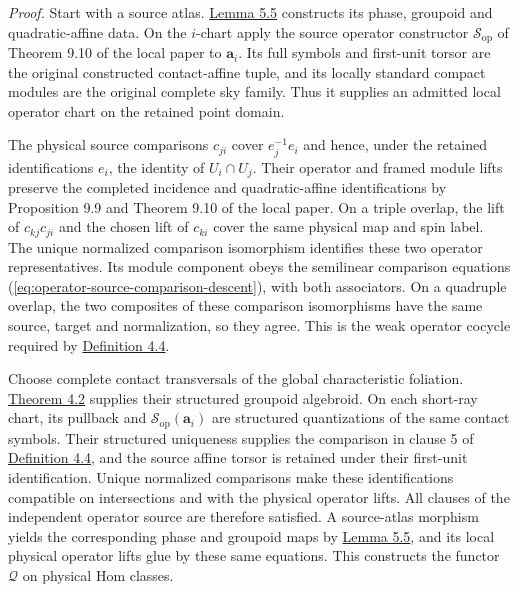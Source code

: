 \documentclass[
  english,
  11pt,
  reqno]{amsart}
\begin{document}
\emph{Proof.} Start with a source atlas.
\hyperref[lem:source-atlas-phase-completion]{Lemma 5.5} constructs its
phase, groupoid and quadratic-affine data. On the \(i\)-chart apply the
source operator constructor \(\mathcal S_{\mathrm{op}}\) of Theorem 9.10
of the local paper to \(\mathbf a_i\). Its full symbols and first-unit
torsor are the original constructed contact-affine tuple, and its
locally standard compact modules are the original complete sky family.
Thus it supplies an admitted local operator chart on the retained point
domain.

The physical source comparisons \(c_{ji}\) cover \(e_j^{-1}e_i\) and
hence, under the retained identifications \(e_i\), the identity of
\(U_i\cap U_j\). Their operator and framed module lifts preserve the
completed incidence and quadratic-affine identifications by Proposition
9.9 and Theorem 9.10 of the local paper. On a triple overlap, the lift
of \(c_{kj}c_{ji}\) and the chosen lift of \(c_{ki}\) cover the same
physical map and spin label. The unique normalized comparison
isomorphism identifies these two operator representatives. Its module
component obeys the semilinear comparison equations
(\ref{eq:operator-source-comparison-descent}), with both associators. On
a quadruple overlap, the two composites of these comparison isomorphisms
have the same source, target and normalization, so they agree. This is
the weak operator cocycle required by
\hyperref[def:independent-operator-monodromy-source-v092]{Definition
4.4}.

Choose complete contact transversals of the global characteristic
foliation.
\hyperref[thm:contact-groupoid-structured-quantization]{Theorem 4.2}
supplies their structured groupoid algebroid. On each short-ray chart,
its pullback and \(\mathcal S_{\mathrm{op}}(\mathbf a_i)\) are
structured quantizations of the same contact symbols. Their structured
uniqueness supplies the comparison in clause 5 of
\hyperref[def:independent-operator-monodromy-source-v092]{Definition
4.4}, and the source affine torsor is retained under their first-unit
identification. Unique normalized comparisons make these identifications
compatible on intersections and with the physical operator lifts. All
clauses of the independent operator source are therefore satisfied. A
source-atlas morphism yields the corresponding phase and groupoid maps
by \hyperref[lem:source-atlas-phase-completion]{Lemma 5.5}, and its
local physical operator lifts glue by these same equations. This
constructs the functor \(\mathcal Q\) on physical Hom classes.
\end{document}
